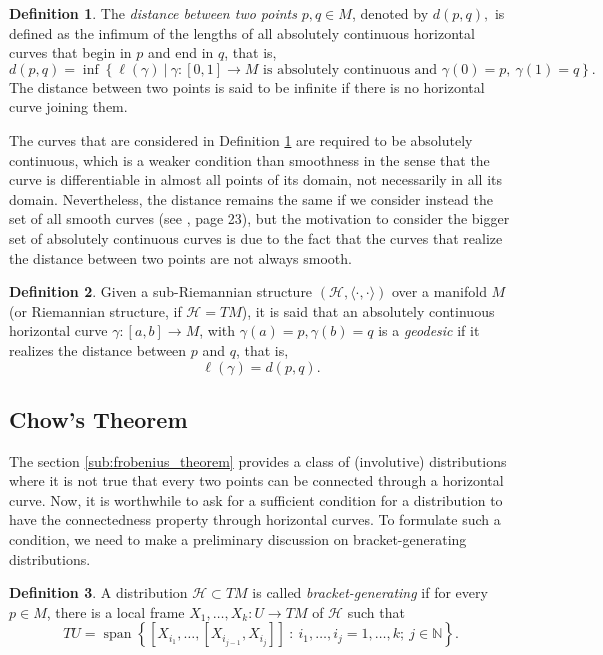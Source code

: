 \documentclass[12pt, letterpaper, reqno]{amsart}
\theoremstyle{definition}
\newtheorem{df}{Definition}
\theoremstyle{plain}
\theoremstyle{remark}
\begin{document}
\begin{df}\label{df:horizontal_distance}
	The \textit{distance between two points} $ p,q\in M $, denoted by $ d(p,q), $   is defined as the infimum of the lengths of all absolutely continuous horizontal curves that begin in $ p $ and end in $ q $, that is, 
$$ d(p,q) = \operatorname{inf} \left\{ \ell(\gamma) \ |\ \gamma:[0,1] \rightarrow {M} \text{ is absolutely continuous and }\gamma(0)=p, \ \gamma(1)=q \right\}. $$ 
The distance between two points is said to be infinite if there is no horizontal curve joining them.
\end{df}

The curves that are considered in Definition \ref{df:horizontal_distance} are required to be absolutely continuous, which is a weaker condition than smoothness in the sense that the curve is differentiable in almost all points of its domain, not necessarily in all its domain. Nevertheless, the distance remains the same if we consider instead the set of all smooth curves (see \cite{montgomery2002tour}, page 23), but the motivation to consider the bigger set of absolutely continuous curves is due to the fact that the curves that realize the distance between two points are not always smooth.

\begin{df}
	Given a sub-Riemannian structure $ (\mathcal{H}, \langle\cdot,\cdot\rangle) $ over a manifold $ M $  (or Riemannian structure, if $ \mathcal{H}=TM $), it is said that an absolutely continuous horizontal curve $ \gamma:  [a,b] \rightarrow M$, with $ \gamma(a)=p, \gamma(b)=q $ is a \textit{geodesic} if it realizes the distance between $ p $ and $ q $, that is,   
	$$ \ell(\gamma)= d(p,q). $$ 
\end{df}


\subsection{Chow's Theorem}%
\label{sub:chow_s_theorem}

The section \ref{sub:frobenius_theorem} provides a class of (involutive) distributions where it is not true that every two points can be connected through a horizontal curve.  Now, it is worthwhile to ask for a sufficient condition for a distribution to have the connectedness property through horizontal curves. To formulate such a condition, we need to make a preliminary discussion on bracket-generating distributions.

\begin{df}
	A distribution $ \mathcal{H}\subset TM $ is called \textit{bracket-generating} if for every $ p\in M $, there is a local frame $ X_1,\dots,X_k: U \rightarrow {TM} $ of $ \mathcal{H} $ such that 
	$$ TU = \operatorname{span}\left\{ [X_{i_1},\dots,[X_{i_{j-1}},X_{i_j}]]\ : \ i_1,\dots,i_j=1,\dots,k;\ j\in \mathbb{N} \right\}.  $$ 
\end{df}
\end{document}
